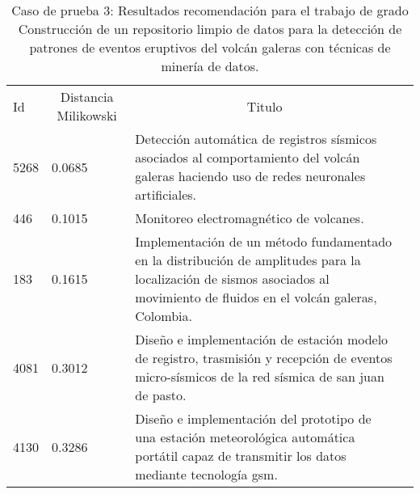 \begin{table}[H]\centering
\caption{Caso de prueba 3: Resultados recomendación para el trabajo de grado Construcción de un repositorio limpio de datos para la detección de patrones de eventos eruptivos del volcán galeras con técnicas de minería de datos.}\label{tab:tablae3}
	\begin{tabularx}{\textwidth}{XXXm{3.0cm}}\toprule

Id &  \multicolumn{1}{c}{Distancia Milikowski } & \multicolumn{1}{c}{Titulo} \\ 
5268 &0.0685 &Detección automática de registros sísmicos asociados al comportamiento del volcán galeras haciendo uso de redes neuronales artificiales.  \\ 
446 & 0.1015 &Monitoreo electromagnético de volcanes.   \\ 
183 & 0.1615 &Implementación de un método fundamentado en la distribución de amplitudes para la localización de sismos asociados al movimiento de fluidos en el volcán galeras, Colombia.   \\ 
4081 &0.3012&Diseño e implementación de estación modelo de registro, trasmisión y recepción de eventos micro-sísmicos de la red sísmica de san juan de pasto. \\
4130 & 0.3286&Diseño e implementación del prototipo de una estación meteorológica automática portátil capaz de transmitir los datos mediante tecnología gsm. \\ 

 \bottomrule
	\end{tabularx}
	
\end{table}









